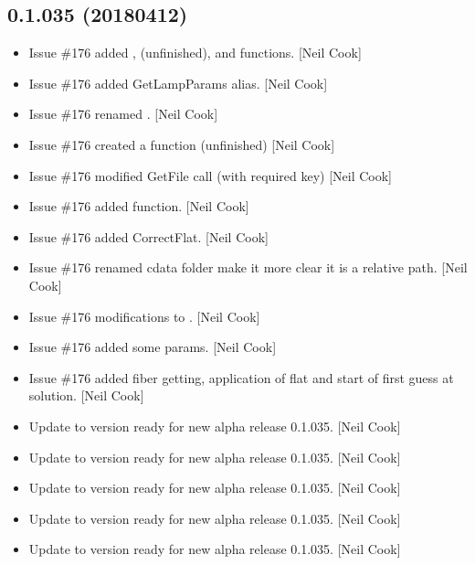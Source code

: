 \documentclass[a4paper,10pt,english]{report}
\begin{document}
\subsection{0.1.035 (2018\sphinxhyphen{}04\sphinxhyphen{}12)}
\label{\detokenize{misc/changelog:id482}}\begin{itemize}
\item {} 
Issue \#176 \sphinxhyphen{} added , 
(unfinished), and  functions. {[}Neil Cook{]}

\item {} 
Issue \#176 \sphinxhyphen{} added GetLampParams alias. {[}Neil Cook{]}

\item {} 
Issue \#176 \sphinxhyphen{} renamed . {[}Neil Cook{]}

\item {} 
Issue \#176 \sphinxhyphen{} created a  function (unfinished) {[}Neil
Cook{]}

\item {} 
Issue \#176 \sphinxhyphen{} modified GetFile call (with required key) {[}Neil Cook{]}

\item {} 
Issue \#176 \sphinxhyphen{} added  function. {[}Neil Cook{]}

\item {} 
Issue \#176 \sphinxhyphen{} added CorrectFlat. {[}Neil Cook{]}

\item {} 
Issue \#176 \sphinxhyphen{} renamed cdata folder \sphinxhyphen{} make it more clear it is a
relative path. {[}Neil Cook{]}

\item {} 
Issue \#176 \sphinxhyphen{} modifications to . {[}Neil Cook{]}

\item {} 
Issue \#176 \sphinxhyphen{} added some  params. {[}Neil Cook{]}

\item {} 
Issue \#176 \sphinxhyphen{} added fiber getting, application of flat and start of
first guess at solution. {[}Neil Cook{]}

\item {} 
Update to version ready for new alpha release 0.1.035. {[}Neil Cook{]}

\item {} 
Update to version ready for new alpha release 0.1.035. {[}Neil Cook{]}

\item {} 
Update to version ready for new alpha release 0.1.035. {[}Neil Cook{]}

\item {} 
Update to version ready for new alpha release 0.1.035. {[}Neil Cook{]}

\item {} 
Update to version ready for new alpha release 0.1.035. {[}Neil Cook{]}

\end{itemize}
\end{document}
